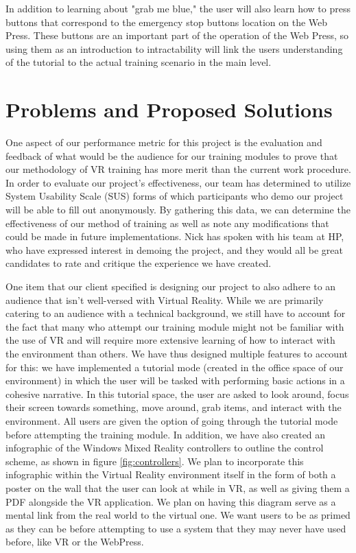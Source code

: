 \documentclass[onecolumn, draftclsnofoot,10pt, compsoc]{IEEEtran}
\begin{document}
In addition to learning about "grab me blue," the user will also learn how to press buttons that correspond to the emergency stop buttons location on the Web Press. These buttons are an important part of the operation of the Web Press, so using them as an introduction to intractability will link the users understanding of the tutorial to the actual training scenario in the main level.

\section{Problems and Proposed Solutions}
One aspect of our performance metric for this project is the evaluation and feedback of what would be the audience for our training modules to prove that our methodology of VR training has more merit than the current work procedure. In order to evaluate our project’s effectiveness, our team has determined to utilize System Usability Scale (SUS) forms of which participants who demo our project will be able to fill out anonymously. By gathering this data, we can determine the effectiveness of our method of training as well as note any modifications that could be made in future implementations. Nick has spoken with his team at HP, who have expressed interest in demoing the project, and they would all be great candidates to rate and critique the experience we have created. 


One item that our client specified is designing our project to also adhere to an audience that isn’t well-versed with Virtual Reality. While we are primarily catering to an audience with a technical background, we still have to account for the fact that many who attempt our training module might not be familiar with the use of VR and will require more extensive learning of how to interact with the environment than others. We have thus designed multiple features to account for this: we have implemented a tutorial mode (created in the office space of our environment) in which the user will be tasked with performing basic actions in a cohesive narrative. In this tutorial space, the user are asked to look around, focus their screen towards something, move around, grab items, and interact with the environment. All users are given the option of going through the tutorial mode before attempting the training module. In addition, we have also created an infographic of the Windows Mixed Reality controllers to outline the control scheme, as shown in figure \ref{fig:controllers}. We plan to incorporate this infographic within the Virtual Reality environment itself in the form of both a poster on the wall that the user can look at while in VR, as well as giving them a PDF alongside the VR application. We plan on having this diagram serve as a mental link from the real world to the virtual one. We want users to be as primed as they can be before attempting to use a system that they may never have used before, like VR or the WebPress.
\end{document}
